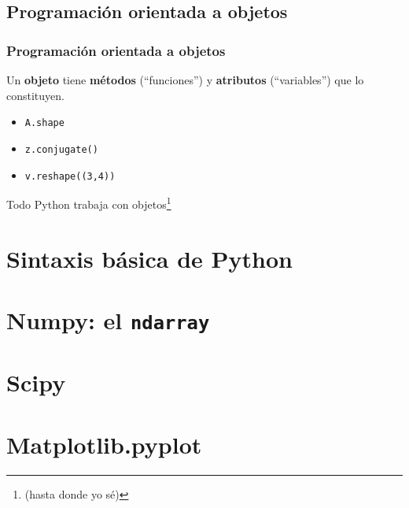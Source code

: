 \documentclass{beamer}
\begin{document}
\subsection{Programación orientada a objetos}

\begin{frame}\frametitle{Programación orientada a objetos}
	Un \textbf{objeto} tiene \textbf{métodos} (``funciones'') y \textbf{atributos} (``variables'') que lo constituyen.

	\begin{itemize}
		\item \texttt{A.shape}
		\item \texttt{z.conjugate()}
		\item \texttt{v.reshape((3,4))}
	\end{itemize}

	Todo Python trabaja con objetos\footnote{\tiny (hasta donde yo sé)}
\end{frame}


\section{Sintaxis básica de Python}

\section{Numpy: el \texttt{ndarray}}

\section{Scipy}

\section{Matplotlib.pyplot}
\end{document}
